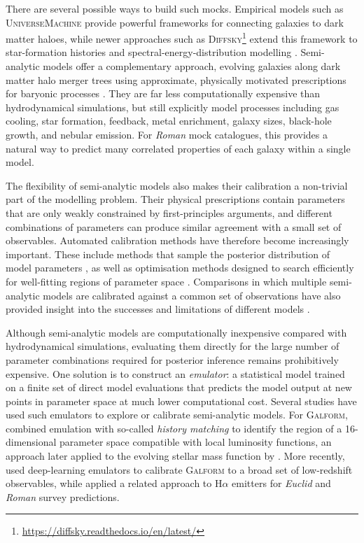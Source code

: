 \documentclass[twocolumn, apj, numberedappendix, iop]{openjournal}
\newcommand{\romanspace}{\textit{Roman}\xspace}
\newcommand{\euclid}{\textit{Euclid}\xspace}
\newcommand{\ha}{H$\alpha$}
\begin{document}
There are several possible ways to build such mocks. Empirical models such as
\textsc{UniverseMachine} \citep{2019MNRAS.488.3143B} provide powerful
frameworks for connecting galaxies to dark matter haloes, while newer
approaches such as \textsc{Diffsky}\footnote{\href{https://diffsky.readthedocs.io/en/latest/}{https://diffsky.readthedocs.io/en/latest/}} extend this framework to star-formation
histories and spectral-energy-distribution modelling \citep{2023MNRAS.518..562A, 2023MNRAS.521.1741H}. Semi-analytic models
offer a complementary approach, evolving galaxies along dark matter halo
merger trees using approximate, physically motivated prescriptions for
baryonic processes \citep[e.g.][]{2006RPPh...69.3101B,2015ARA&A..53...51S}.
They are far less computationally expensive than hydrodynamical simulations,
but still explicitly model processes including gas cooling, star formation,
feedback, metal enrichment, galaxy sizes, black-hole growth, and nebular
emission. For \romanspace{}  mock catalogues, this provides a natural way to predict
many correlated properties of each galaxy within a single model.


The flexibility of semi-analytic models also makes their calibration a
non-trivial part of the modelling problem. Their physical prescriptions
contain parameters that are only weakly constrained by first-principles
arguments, and different combinations of parameters can produce similar
agreement with a small set of observables. Automated calibration methods have therefore become increasingly important.
These include methods that sample the posterior distribution of model
parameters \citep[e.g.][]{2009MNRAS.396..535H,2011MNRAS.416.1949L,
2015MNRAS.451.2663H}, as well as optimisation methods designed to search
efficiently for well-fitting regions of parameter space
\citep[e.g.][]{2015ApJ...801..139R}. Comparisons in which multiple
semi-analytic models are calibrated against a common set of observations
have also provided insight into the successes and limitations of different
models \citep[e.g.][]{2018MNRAS.475.2936K}.

Although semi-analytic models are computationally inexpensive compared with
hydrodynamical simulations, evaluating them directly for the large number of
parameter combinations required for posterior inference remains prohibitively
expensive. One solution is to construct an \emph{emulator}: a statistical
model trained on a finite set of direct model evaluations that predicts the
model output at new points in parameter space at much lower computational
cost. Several studies have used such emulators to explore or calibrate
semi-analytic models. For \textsc{Galform}, \citet{2010MNRAS.407.2017B}
combined emulation with so-called \emph{history matching} to identify the
region of a 16-dimensional parameter space compatible with local luminosity
functions, an approach later applied to the evolving stellar mass function
by \citet{2017MNRAS.466.2418R}. More recently,
\citet{2021MNRAS.506.4011E} used deep-learning emulators to calibrate
\textsc{Galform} to a broad set of low-redshift observables, while
\citet{2024MNRAS.535.3324M} applied a related approach to \ha{} emitters for
\euclid{} and \romanspace{} survey predictions.
\end{document}
